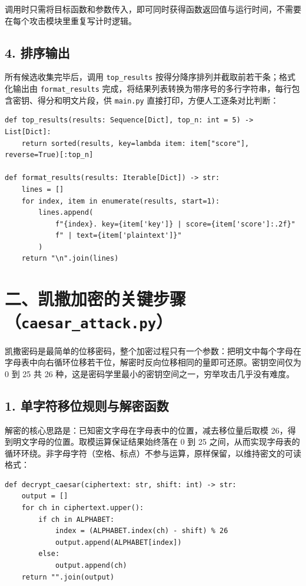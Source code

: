 \documentclass[12pt, a4paper]{article}
\begin{document}
调用时只需将目标函数和参数传入，即可同时获得函数返回值与运行时间，不需要在每个攻击模块里重复写计时逻辑。

\subsection{4. 排序输出}

所有候选收集完毕后，调用 \texttt{top\_results} 按得分降序排列并截取前若干条；格式化输出由 \texttt{format\_results} 完成，将结果列表转换为带序号的多行字符串，每行包含密钥、得分和明文片段，供 \texttt{main.py} 直接打印，方便人工逐条对比判断：

\begin{lstlisting}[style=python, caption={排序与格式化输出函数（common.py）}]
def top_results(results: Sequence[Dict], top_n: int = 5) -> List[Dict]:
    return sorted(results, key=lambda item: item["score"], reverse=True)[:top_n]

def format_results(results: Iterable[Dict]) -> str:
    lines = []
    for index, item in enumerate(results, start=1):
        lines.append(
            f"{index}. key={item['key']} | score={item['score']:.2f}"
            f" | text={item['plaintext']}"
        )
    return "\n".join(lines)
\end{lstlisting}

\section{二、凯撒加密的关键步骤（\texttt{caesar\_attack.py}）}

凯撒密码是最简单的位移密码，整个加密过程只有一个参数：把明文中每个字母在字母表中向右循环位移若干位，解密时反向位移相同的量即可还原。密钥空间仅为 0 到 25 共 26 种，这是密码学里最小的密钥空间之一，穷举攻击几乎没有难度。

\subsection{1. 单字符移位规则与解密函数}

解密的核心思路是：已知密文字母在字母表中的位置，减去移位量后取模 26，得到明文字母的位置。取模运算保证结果始终落在 0 到 25 之间，从而实现字母表的循环环绕。非字母字符（空格、标点）不参与运算，原样保留，以维持密文的可读格式：

\begin{lstlisting}[style=python, caption={凯撒解密函数（caesar\_attack.py）}]
def decrypt_caesar(ciphertext: str, shift: int) -> str:
    output = []
    for ch in ciphertext.upper():
        if ch in ALPHABET:
            index = (ALPHABET.index(ch) - shift) % 26
            output.append(ALPHABET[index])
        else:
            output.append(ch)
    return "".join(output)
\end{lstlisting}
\end{document}
